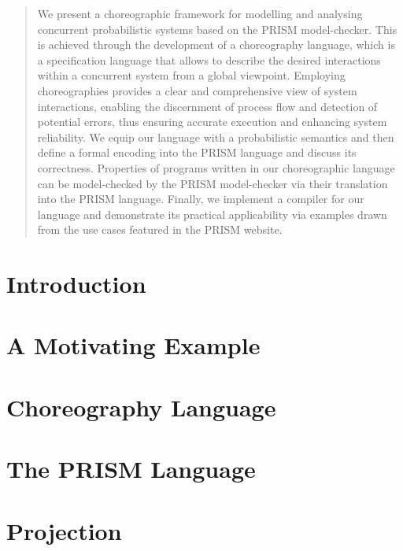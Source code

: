 \documentclass{lmcs} %
\theoremstyle{plain}\newtheorem{satz}[thm]{Satz} %
\begin{document}
\begin{abstract}
  \noindent We present a choreographic framework for modelling and
  analysing concurrent probabilistic systems based on the PRISM
  model-checker. This is achieved through the development of a
  choreography language, which is a specification language that allows
  to describe the desired interactions within a concurrent system from
  a global viewpoint. Employing choreographies provides a clear and
  comprehensive view of system interactions, enabling the discernment
  of process flow and detection of potential errors, thus ensuring
  accurate execution and enhancing system reliability. We equip our
  language with a probabilistic semantics and then define a formal
  encoding into the PRISM language and discuss its
  correctness. Properties of programs written in our choreographic
  language can be model-checked by the PRISM model-checker via their
  translation into the PRISM language.  Finally, we implement a
  compiler for our language and demonstrate its practical
  applicability via examples drawn from the use cases featured in the
  PRISM website.
\end{abstract}

\maketitle

\section{Introduction}\label{sec:intro}


\section{A Motivating Example}\label{sec:example}


\section{Choreography Language}\label{sec:chor}


\section{The PRISM Language}\label{sec:prism}


\section{Projection}\label{sec:proj}

\end{document}
